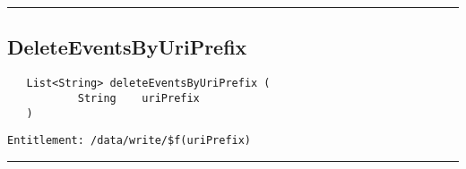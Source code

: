 \rule{12cm}{2pt}
\subsection{DeleteEventsByUriPrefix}
\label{Api:DeleteEventsByUriPrefix}
\begin{verbatim}
   List<String> deleteEventsByUriPrefix (
           String    uriPrefix
   )
\end{verbatim}
\begin{Verbatim}[fontsize=\small, formatcom=\color{Maroon}]
  Entitlement: /data/write/$f(uriPrefix)
\end{Verbatim}



\rule{12cm}{2pt}
